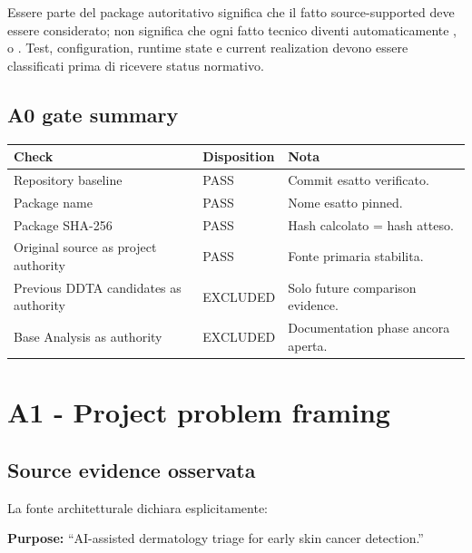 \documentclass[11pt,a4paper]{article}
\begin{document}
\begin{ddtaprinciple}[title={Authority non significa promozione automatica}]
Essere parte del package autoritativo significa che il fatto source-supported deve essere considerato; non significa che ogni fatto tecnico diventi automaticamente \MR, \DEC{} o \REQ. Test, configuration, runtime state e current realization devono essere classificati prima di ricevere status normativo.
\end{ddtaprinciple}

\subsection{A0 gate summary}

\begin{tabularx}{\textwidth}{L{55mm}L{27mm}Y}
\toprule
\textbf{Check} & \textbf{Disposition} & \textbf{Nota} \\
\midrule
Repository baseline & PASS & Commit esatto verificato. \\
Package name & PASS & Nome esatto pinned. \\
Package SHA-256 & PASS & Hash calcolato = hash atteso. \\
Original source as project authority & PASS & Fonte primaria stabilita. \\
Previous DDTA candidates as authority & EXCLUDED & Solo future comparison evidence. \\
Base Analysis as authority & EXCLUDED & Documentation phase ancora aperta. \\
\bottomrule
\end{tabularx}

\section{A1 - Project problem framing}

\subsection{Source evidence osservata}

La fonte architetturale dichiara esplicitamente:

\begin{ddtaexample}[title={OR2 Architecture Document - purpose}]
\textbf{Purpose:} ``AI-assisted dermatology triage for early skin cancer detection.''
\end{ddtaexample}
\end{document}
